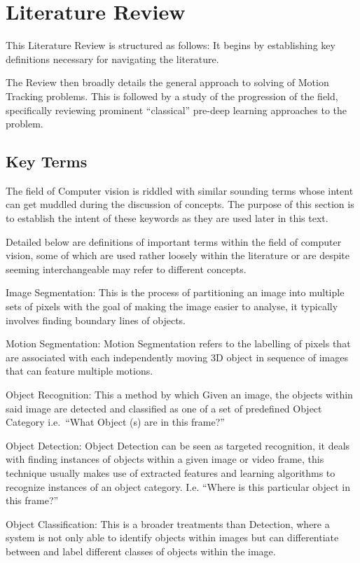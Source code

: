 \chapter{Literature Review}\label{chapter_literature_review}
This Literature Review is structured as follows: It begins by establishing key
definitions necessary for navigating the literature.

The Review then broadly details the general approach to solving of Motion Tracking
problems. This is followed by a study of the progression of the field,
specifically reviewing prominent “classical” pre-deep learning approaches to the
problem.

\section{Key Terms}
The field of Computer vision is riddled with similar sounding terms whose intent
can get muddled during the discussion of concepts.  The purpose of this section
is to establish the intent of these keywords as they are used later in this text.

Detailed below are definitions of important terms within the field of computer
vision, some of which are used rather loosely within the literature or are
despite seeming interchangeable may refer to different concepts. 

Image Segmentation: This is the process of partitioning an image into multiple
sets of pixels with the goal of making the image easier to analyse, it typically
involves finding boundary lines of objects. 

Motion Segmentation: Motion Segmentation refers to the labelling of pixels that
are associated with each independently moving 3D object in sequence of images
that can feature multiple motions.~\cite{Tekalp2014}

Object Recognition: This a method by which Given an image, the objects within
said image are detected and classified as one of a set of predefined Object
Category i.e.\ ``What Object (s) are in this frame?''

Object Detection: Object Detection can be seen as targeted recognition, it deals
with finding instances of objects within a given image or video frame, this
technique usually makes use of extracted features and learning algorithms to
recognize instances of an object category.  I.e. “Where is this particular
object in this frame?”

Object Classification: This is a broader treatments than Detection, where a
system is not only able to identify objects within images but can differentiate
between and label different classes of objects within the image. 

